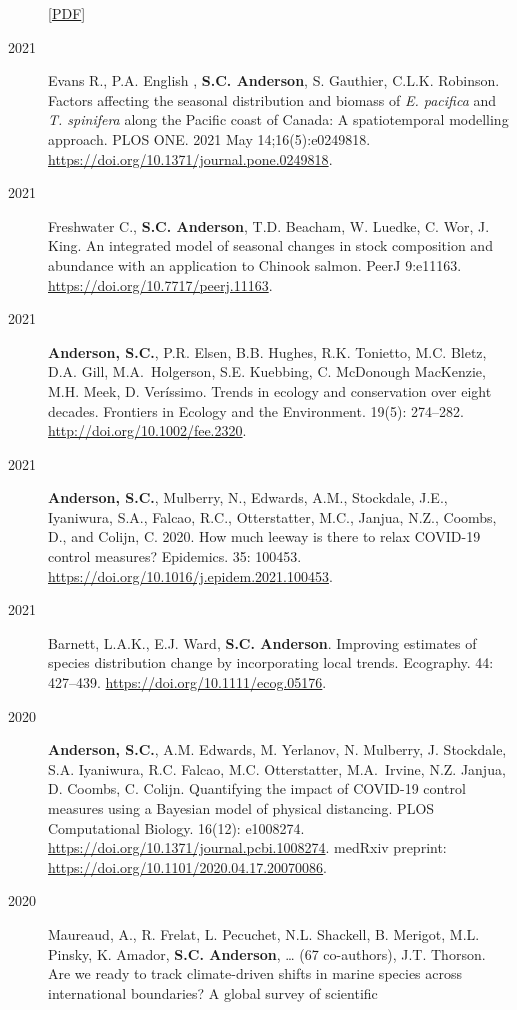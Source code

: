 \begin{description}
{[}\href{https://www.dropbox.com/s/cmkzlxgiez6rzc0/English_etal_2022_contrasting_climate_velocity.pdf?dl=1}{PDF}{]}
\item[2021]
Evans R., P.A. English , \textbf{S.C. Anderson}, S. Gauthier, C.L.K.
Robinson. Factors affecting the seasonal distribution and biomass of
\emph{E. pacifica} and \emph{T. spinifera} along the Pacific coast of
Canada: A spatiotemporal modelling approach. PLOS ONE. 2021 May
14;16(5):e0249818. \url{https://doi.org/10.1371/journal.pone.0249818}.
\item[2021]
Freshwater C., \textbf{S.C. Anderson}, T.D. Beacham, W. Luedke, C. Wor,
J. King. An integrated model of seasonal changes in stock composition
and abundance with an application to Chinook salmon. PeerJ 9:e11163.
\url{https://doi.org/10.7717/peerj.11163}.
\item[2021]
\textbf{Anderson, S.C.}, P.R. Elsen, B.B. Hughes, R.K. Tonietto, M.C.
Bletz, D.A. Gill, M.A.\ Holgerson, S.E. Kuebbing, C. McDonough MacKenzie,
M.H. Meek, D. Veríssimo. Trends in ecology and conservation over eight
decades. Frontiers in Ecology and the Environment. 19(5): 274--282.
\url{http://doi.org/10.1002/fee.2320}.
\item[2021]
\textbf{Anderson, S.C.}, Mulberry, N., Edwards, A.M., Stockdale, J.E.,
Iyaniwura, S.A., Falcao, R.C., Otterstatter, M.C., Janjua, N.Z., Coombs,
D., and Colijn, C. 2020. How much leeway is there to relax COVID-19
control measures? Epidemics. 35: 100453.
\url{https://doi.org/10.1016/j.epidem.2021.100453}.
\item[2021]
Barnett, L.A.K., E.J. Ward, \textbf{S.C. Anderson}. Improving estimates
of species distribution change by incorporating local trends. Ecography.
44: 427--439. \url{https://doi.org/10.1111/ecog.05176}.
\item[2020]
\textbf{Anderson, S.C.}, A.M. Edwards, M. Yerlanov, N. Mulberry, J.
Stockdale, S.A. Iyaniwura, R.C. Falcao, M.C. Otterstatter, M.A.\ Irvine,
N.Z. Janjua, D. Coombs, C. Colijn. Quantifying the impact of COVID-19
control measures using a Bayesian model of physical distancing. PLOS
Computational Biology. 16(12): e1008274.
\url{https://doi.org/10.1371/journal.pcbi.1008274}. medRxiv preprint:
\url{https://doi.org/10.1101/2020.04.17.20070086}.
\item[2020]
Maureaud, A., R. Frelat, L. Pecuchet, N.L. Shackell, B. Merigot, M.L.
Pinsky, K. Amador, \textbf{S.C. Anderson}, \ldots{} (67 co-authors),
J.T. Thorson. Are we ready to track climate-driven shifts in marine
species across international boundaries? A global survey of scientific

\end{description}

